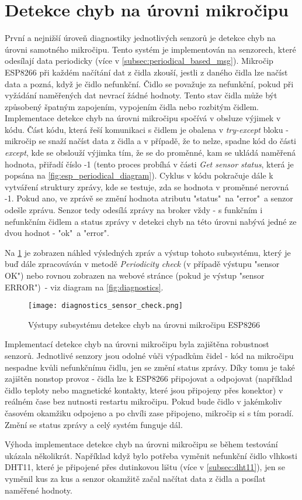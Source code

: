 \section{Detekce chyb na úrovni mikročipu} \label{sec:error_detection_esp}
První a nejnižší úroveň diagnostiky jednotlivých senzorů je detekce chyb na úrovni samotného mikročipu. Tento systém je implementován na senzorech, které odesílají data periodicky (více v \cref{subsec:periodical_based_msg}). Mikročip ESP8266 při každém načítání dat z čidla zkouší, jestli z daného čidla lze načíst data a pozná, když je čidlo nefunkční. Čidlo se považuje za nefunkční, pokud při vyžádání naměřených dat nevrací žádné hodnoty. Tento stav čidla může být způsobený špatným zapojením, vypojením čidla nebo rozbitým čidlem. Implementace detekce chyb na úrovni mikročipu spočívá v obsluze výjimek v kódu. Část kódu, která řeší komunikaci s čidlem je obalena v \textit{try-except} bloku - mikročip se snaží načíst data z čidla a v případě, že to nelze, spadne kód do části \textit{except}, kde se obslouží výjimka tím, že se do proměnné, kam se ukládá naměřená hodnota, přiřadí číslo -1 (tento proces probíhá v části \textit{Get sensor status}, která je popsána na \cref{fig:esp_periodical_diagram}). Cyklus v kódu pokračuje dále k vytváření struktury zprávy, kde se testuje, zda se hodnota v proměnné nerovná -1. Pokud ano, ve zprávě se změní hodnota atributu "status"\ na "error"\ a senzor odešle zprávu. Senzor tedy odesílá zprávy na broker vždy - s funkčním i nefunkčním čidlem a status zprávy v detekci chyb na této úrovni nabývá jedné ze dvou hodnot - "ok"\ a "error".\par
Na \cref{fig:diagnostics_sensor_check} je zobrazen náhled výsledných zpráv a výstup tohoto subsystému, který je buď dále zpracováván v metodě \textit{Periodicity check} (v případě výstupu "sensor OK") nebo rovnou zobrazen na webové stránce (pokud je výstup "sensor ERROR")\ - viz diagram na \cref{fig:diagnostics}. 

\begin{figure}[H]
  \centering
  \texttt{[image: diagnostics\_sensor\_check.png]}
  \caption{Výstupy subsystému detekce chyb na úrovni mikročipu ESP8266}
  \label{fig:diagnostics_sensor_check}
\end{figure} 

Implementací detekce chyb na úrovni mikročipu byla zajištěna robustnost senzorů. Jednotlivé senzory jsou odolné vůči výpadkům čidel - kód na mikročipu nespadne kvůli nefunkčnímu čidlu, jen se změní status zprávy. Díky tomu je také zajištěn nonstop provoz - čidla lze k ESP8266 připojovat a odpojovat (například čidlo teploty nebo magnetické kontakty, které jsou připojeny přes konektor) v reálném čase bez nutnosti restartu mikročipu. Pokud bude čidlo v jakémkoliv časovém okamžiku odpojeno a po chvíli zase připojeno, mikročip si s tím poradí. Změní se status zprávy a celý systém funguje dál. \par
Výhoda implementace detekce chyb na úrovni mikročipu se během testování ukázala několikrát. Například když bylo potřeba vyměnit nefunkční čidlo vlhkosti DHT11, které je připojené přes dutinkovou lištu (více v \cref{subsec:dht11}), jen se vyměnil kus za kus a senzor okamžitě začal načítat data z čidla a posílat naměřené hodnoty.

